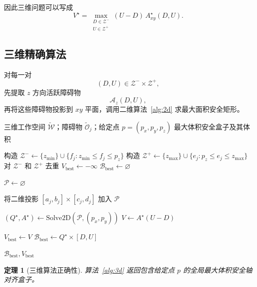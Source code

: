 \documentclass[UTF8,12pt,a4paper]{ctexart}
\newtheorem{theorem}{定理}
\begin{document}
因此三维问题可以写成
\begin{equation}
\boxed{
V^\star
=
\max_{\substack{
D\in\mathcal Z^-\\
U\in\mathcal Z^+}}
(U-D)\,
A^\star_{xy}(D,U).
}
\end{equation}

\subsection{三维精确算法}

对每一对
\[
(D,U)\in\mathcal Z^-\times\mathcal Z^+,
\]
先提取 $z$ 方向活跃障碍物
\[
\mathcal A_z(D,U),
\]
再将这些障碍物投影到 $xy$ 平面，调用二维算法~\ref{alg:2d} 求最大面积安全矩形。

\begin{algorithm}[htbp]
\caption{三维最大体积安全非对称盒子}
\label{alg:3d}
\footnotesize
\begin{algorithmic}[1]
\Require 三维工作空间 $\widetilde{\mathcal W}$；障碍物 $\widetilde{\mathcal O}_j$；给定点 $p=(p_x,p_y,p_z)$
\Ensure 最大体积安全盒子及其体积

\State 构造 $\mathcal Z^-\gets\{z_{\min}\}\cup\{f_j:z_{\min}\le f_j\le p_z\}$
\State 构造 $\mathcal Z^+\gets\{z_{\max}\}\cup\{e_j:p_z\le e_j\le z_{\max}\}$
\State 对 $\mathcal Z^-$ 和 $\mathcal Z^+$ 去重
\State $V_{\mathrm{best}}\gets-\infty$
\State $\mathcal B_{\mathrm{best}}\gets\varnothing$


        \State $\mathcal P\gets\varnothing$

                \State 将二维投影 $[a_j,b_j]\times[c_j,d_j]$ 加入 $\mathcal P$
            \EndIf
        \EndFor

        \State $(Q^\star,A^\star)\gets\mathrm{Solve2D}(\mathcal P,(p_x,p_y))$
        \State $V\gets A^\star(U-D)$

            \State $V_{\mathrm{best}}\gets V$
            \State $\mathcal B_{\mathrm{best}}\gets Q^\star\times[D,U]$
        \EndIf

    \EndFor
\EndFor

\State \Return $\mathcal B_{\mathrm{best}},V_{\mathrm{best}}$
\end{algorithmic}
\end{algorithm}

\begin{theorem}[三维算法正确性]
算法~\ref{alg:3d} 返回包含给定点 $p$ 的全局最大体积安全轴对齐盒子。
\end{theorem}
\end{document}
